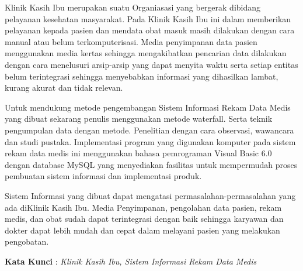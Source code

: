 \documentclass{jtetiproposalskripsi}
\begin{document}
\cover

\approvalpage


\begin{abstractind}
Klinik Kasih Ibu merupakan suatu Organiasasi yang bergerak dibidang pelayanan kesehatan masyarakat. Pada Klinik Kasih Ibu ini dalam memberikan pelayanan kepada pasien dan mendata obat masuk masih dilakukan dengan cara manual atau belum terkomputerisasi. Media penyimpanan data pasien menggunakan media kertas sehingga mengakibatkan pencarian data dilakukan dengan cara menelusuri arsip-arsip yang dapat menyita waktu serta setiap entitas belum terintegrasi sehingga menyebabkan informasi yang dihasilkan lambat, kurang akurat dan tidak relevan. 

Untuk mendukung metode pengembangan Sistem Informasi Rekam Data Medis yang dibuat sekarang penulis menggunakan metode waterfall. Serta teknik pengumpulan data dengan metode. Penelitian dengan cara observasi, wawancara dan studi pustaka. Implementasi program yang digunakan komputer pada sistem rekam data medis ini menggunakan bahasa pemrograman Visual Basic 6.0 dengan database MySQL yang menyediakan fasilitas untuk mempermudah proses pembuatan sistem informasi dan implementasi produk. 

Sistem Informasi yang dibuat dapat mengatasi permasalahan-permasalahan yang ada diKlinik Kasih Ibu. Media Penyimpanan, pengolahan data pasien, rekam medis, dan obat sudah dapat terintegrasi dengan baik sehingga karyawan dan dokter dapat lebih mudah dan cepat dalam melayani pasien yang melakukan pengobatan.

\begin{flushleft}

\textbf{Kata Kunci} : \textit{Klinik Kasih Ibu, Sistem Informasi Rekam Data Medis}
\end{flushleft}

\bigskip

\end{abstractind}
\end{document}

